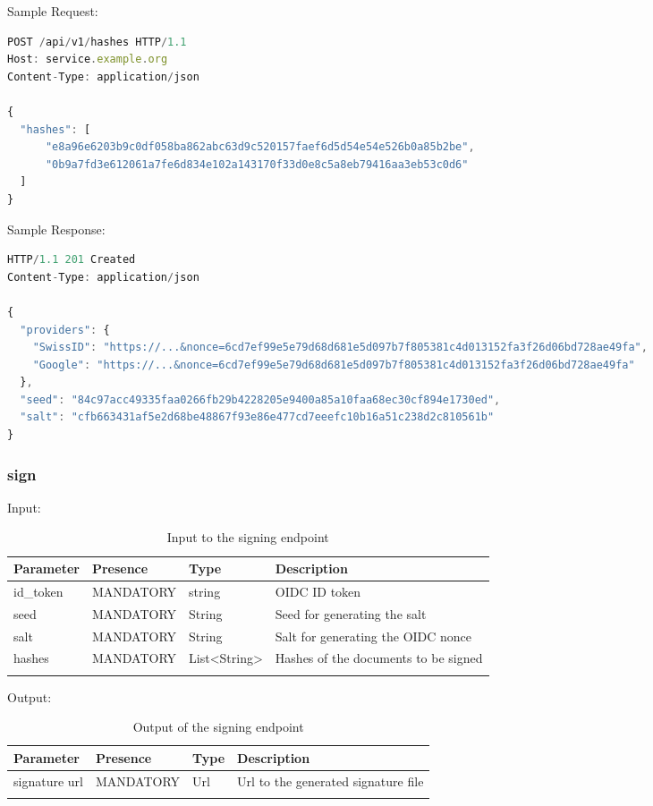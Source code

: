 Sample Request:
\begin{lstlisting}[caption={login request}, captionpos=b, language=JavaScript, label={lst:hashesrequest}]
POST /api/v1/hashes HTTP/1.1
Host: service.example.org
Content-Type: application/json

{
  "hashes": [
	  "e8a96e6203b9c0df058ba862abc63d9c520157faef6d5d54e54e526b0a85b2be",
	  "0b9a7fd3e612061a7fe6d834e102a143170f33d0e8c5a8eb79416aa3eb53c0d6"
  ]
}
\end{lstlisting}

Sample Response:
\begin{lstlisting}[caption={login response}, captionpos=b, language=JavaScript, label={lst:hashesresponse}]
HTTP/1.1 201 Created
Content-Type: application/json

{
  "providers": {
  	"SwissID": "https://...&nonce=6cd7ef99e5e79d68d681e5d097b7f805381c4d013152fa3f26d06bd728ae49fa",
	"Google": "https://...&nonce=6cd7ef99e5e79d68d681e5d097b7f805381c4d013152fa3f26d06bd728ae49fa"
  },
  "seed": "84c97acc49335faa0266fb29b4228205e9400a85a10faa68ec30cf894e1730ed",
  "salt": "cfb663431af5e2d68be48867f93e86e477cd7eeefc10b16a51c238d2c810561b"
}
\end{lstlisting}

\subsubsection{sign}
Input:

\begin{longtable}{|l|l|l|l|}
	\hline
	\textbf{Parameter} & \textbf{Presence} & \textbf{Type} & \textbf{Description} \\ \hline
	id\_token & MANDATORY & string & OIDC ID token \\ \hline
	seed & MANDATORY & String & Seed for generating the salt \\ \hline
	salt & MANDATORY & String & Salt for generating the OIDC nonce \\ \hline
	hashes & MANDATORY & List<String> & Hashes of the documents to be signed \\ \hline
	\caption{Input to the signing endpoint}
\end{longtable}

Output:

\begin{longtable}{|l|l|l|l|}
	\hline
	\textbf{Parameter} & \textbf{Presence} & \textbf{Type} & \textbf{Description} \\ \hline
	signature url & MANDATORY & Url & Url to the generated signature file\\ \hline
	\caption{Output of the signing endpoint}
\end{longtable}

